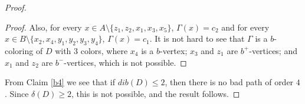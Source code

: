 \documentclass[10pt,a4paper]{amsart}
\begin{document}
\begin{proof}
\begin{proof}
Also, for every $x\in A\setminus\{z_1, z_2, x_1, x_3, x_5\}$, $\Gamma(x) = c_2$ and for every $x\in B\setminus\{x_2, x_4, y_1, y_2, y_3, y_4\}$, $\Gamma(x) = c_1$. It is not hard to see that $\Gamma$ is a $b$-coloring of $D$ with 3 colors, where  $x_4$ is a  $b$-vertex;  $x_3$ and $z_1$ are $b^+$-vertices; and $x_1$ and $z_2$  are $b^-$-vertices, which is not possible. \end{proof}

From Claim \ref{b4} we see that if $dib(D)\leq 2$, then there is no bad path of order $4$. Since $\delta(D)\geq 2$, this is not possible, and the result follows. 

\end{proof}
\end{document}
